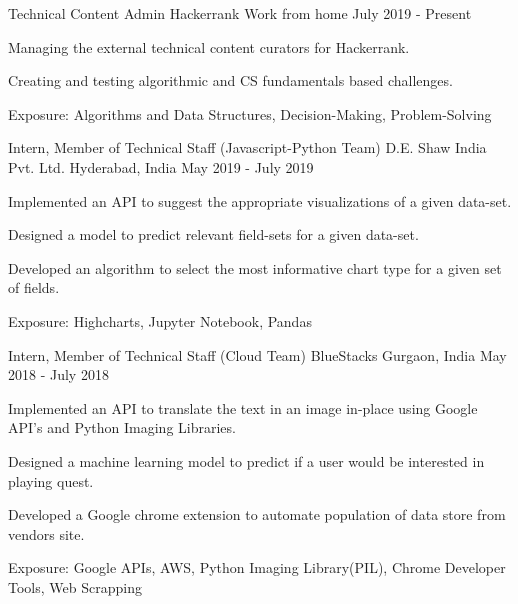 \begin{cventries}
    \cventry
    {Technical Content Admin}
    {Hackerrank}
    {Work from home}
    {July 2019 - Present}
    {
      \begin{cvitems}
        \item {Managing the external technical content curators for Hackerrank.}
        \item {Creating and testing algorithmic and CS fundamentals based challenges.}
        \item {Exposure: Algorithms and Data Structures, Decision-Making, Problem-Solving}
      \end{cvitems}
    }
  \cventry
    {Intern, Member of Technical Staff (Javascript-Python Team)}
    {D.E. Shaw India Pvt. Ltd.}
    {Hyderabad, India}
    {May 2019 - July 2019}
    {
      \begin{cvitems}
        \item {Implemented an API to suggest the appropriate visualizations of a given data-set.}
        \item {Designed a model to predict relevant field-sets for a given data-set.}
        \item {Developed an algorithm to select the most informative chart type for a given set of fields.}
        \item {Exposure: Highcharts, Jupyter Notebook, Pandas}
      \end{cvitems}
    }
    \cventry
    {Intern, Member of Technical Staff (Cloud Team)}
    {BlueStacks}
    {Gurgaon, India}
    {May 2018 - July 2018}
    {
      \begin{cvitems}
        \item {Implemented an API to translate the text in an image in-place using Google API's and Python Imaging Libraries.}
        \item {Designed a machine learning model to predict if a user would be interested in playing quest.}
        \item {Developed a Google chrome extension to automate population of data store from vendors site.}
        \item {Exposure: Google APIs, AWS, Python Imaging Library(PIL), Chrome Developer Tools, Web Scrapping}
      \end{cvitems}
    }
\end{cventries}
